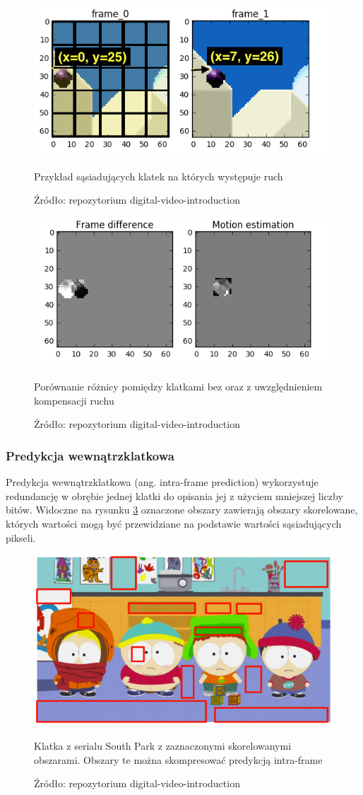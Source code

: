\begin{figure}[H]
    \centering
    \includegraphics[width=.5\textwidth]{img/rozdzial2/original_frames_motion_estimation}
    \caption{Przykład sąsiadujących klatek na których występuje ruch}
    \caption*{Źródło: repozytorium digital-video-introduction \cite{digital_video_introduction}}
    \label{fig:motion_compensation}
\end{figure}

\begin{figure}[H]
    \centering
    \includegraphics[width=.5\textwidth]{img/rozdzial2/difference_frames}
    \caption{Porównanie różnicy pomiędzy klatkami bez oraz z uwzględnieniem kompensacji ruchu}
    \caption*{Źródło: repozytorium digital-video-introduction \cite{digital_video_introduction}}
    \label{fig:motion_compensation_residual}
\end{figure}

\subsubsection{Predykcja wewnątrzklatkowa}

Predykcja wewnątrzklatkowa (ang. intra-frame prediction) wykorzystuje redundancję w obrębie jednej
klatki do opisania jej z użyciem mniejszej liczby bitów. Widoczne na rysunku
\ref{fig:intra_frame_compression} oznaczone obszary zawierają obszary skorelowane, których wartości
mogą być przewidziane na podstawie wartości sąsiadujących pikseli.

\begin{figure}[H]
    \centering
    \includegraphics[width=.5\textwidth]{img/rozdzial2/repetitions_in_space}
    \caption[Klatka z serialu South Park z zaznaczonymi skorelowanymi obszarami.]{Klatka z serialu South Park z zaznaczonymi skorelowanymi obszarami. Obszary te można skompresować predykcją intra-frame}
    \caption*{Źródło: repozytorium digital-video-introduction \cite{digital_video_introduction}}
    \label{fig:intra_frame_compression}
\end{figure}


